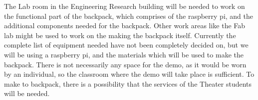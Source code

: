 The Lab room in the Engineering Research building will be needed to work on the functional part of the backpack, which comprises of the raspberry pi, and the additional components needed for the backpack. Other work areas like the Fab lab might be used to work on the making the backpack itself. Currently the complete list of equipment needed have not been completely decided on, but we will be using a raspberry pi, and the materials which will be used to make the backpack. There is not necessarily any space for the demo, as it would be worn by an individual, so the classroom where the demo will take place is sufficient. To make to backpack, there is a possibility that the services of the Theater students will be needed. 
